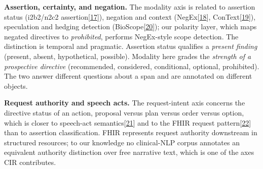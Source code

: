 \textbf{Assertion, certainty, and negation.} The modality axis is related to assertion status (i2b2/n2c2 assertion{[}\hyperref[r17]{17}{]}), negation and context (NegEx{[}\hyperref[r18]{18}{]}, ConText{[}\hyperref[r19]{19}{]}), speculation and hedging detection (BioScope{[}\hyperref[r20]{20}{]}); our polarity layer, which maps negated directives to \emph{prohibited}, performs NegEx-style scope detection. The distinction is temporal and pragmatic. Assertion status qualifies a \emph{present finding} (present, absent, hypothetical, possible). Modality here grades the \emph{strength of a prospective directive} (recommended, considered, conditional, optional, prohibited). The two answer different questions about a span and are annotated on different objects.

\textbf{Request authority and speech acts.} The request-intent axis concerns the directive status of an action, proposal versus plan versus order versus option, which is closer to speech-act semantics{[}\hyperref[r21]{21}{]} and to the FHIR request pattern{[}\hyperref[r22]{22}{]} than to assertion classification. FHIR represents request authority downstream in structured resources; to our knowledge no clinical-NLP corpus annotates an equivalent authority distinction over free narrative text, which is one of the axes CIR contributes.

